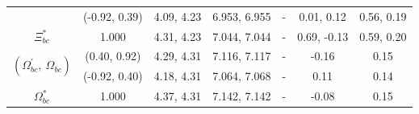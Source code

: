 \documentclass[prd,twocolumn,floatfix,nofootinbib]{revtex4}
\begin{document}
\begin{table}[!htbp]
\begin{tabular}{ccccccc}
                            &(-0.92, 0.39)      &4.09, 4.23	    &6.953, 6.955	    &-          &0.01, 0.12             &0.56, 0.19 \\
        $\Xi_{bc}^{\ast}$ 	&1.000              &4.31, 4.23	    &7.044, 7.044	    &-          &0.69, -0.13            &0.59, 0.20 \\
        \multirow{2}{*}{$\left(\Omega_{bc}^{\prime},\ \Omega_{bc}\right)$}
                            &(0.40, 0.92)       &4.29, 4.31	    &7.116, 7.117	    &-          &-0.16                  &0.15 \\
                            &(-0.92, 0.40)      &4.18, 4.31	    &7.064, 7.068	    &-          &0.11                   &0.14 \\
        $\Omega_{bc}^{\ast}$&1.000              &4.37, 4.31	    &7.142, 7.142	    &-          &-0.08                  &0.15 \\
        \hline\hline
    \end{tabular}
\end{table}
\end{document}
